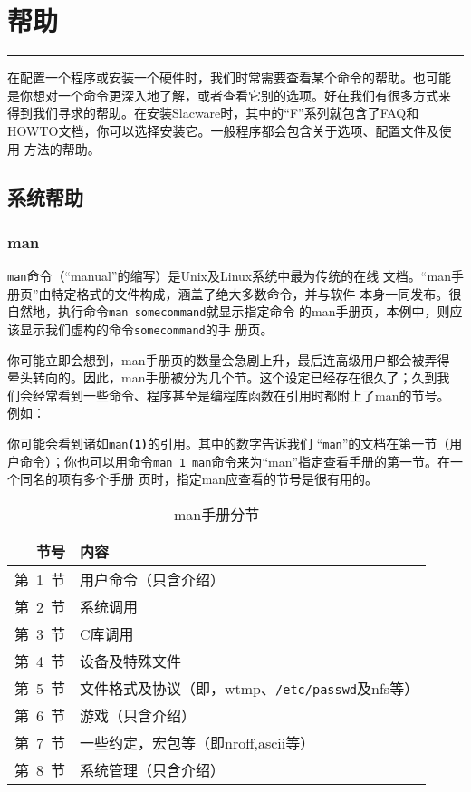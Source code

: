 
\chapter{帮助}
\label{chap:help}

\rule[0mm]{\textwidth}{.1pt}

在配置一个程序或安装一个硬件时，我们时常需要查看某个命令的帮助。也可能
是你想对一个命令更深入地了解，或者查看它别的选项。好在我们有很多方式来
得到我们寻求的帮助。在安装Slacware时，其中的``F''系列就包含了FAQ和
HOWTO文档，你可以选择安装它。一般程序都会包含关于选项、配置文件及使用
方法的帮助。

\section{系统帮助}
\label{sec:help:systemHelp}

\subsection{man}
\label{sec:help:systemHelp:man}

\texttt{man}命令（``manual''的缩写）是Unix及Linux系统中最为传统的在线
文档。``man手册页''由特定格式的文件构成，涵盖了绝大多数命令，并与软件
本身一同发布。很自然地，执行命令\texttt{man somecommand}就显示指定命令
的man手册页，本例中，则应该显示我们虚构的命令\texttt{somecommand}的手
册页。

你可能立即会想到，man手册页的数量会急剧上升，最后连高级用户都会被弄得
晕头转向的。因此，man手册被分为几个节。这个设定已经存在很久了；久到我
们会经常看到一些命令、程序甚至是编程库函数在引用时都附上了man的节号。
例如：

你可能会看到诸如\texttt{man\textbf{(1)}}的引用。其中的数字告诉我们
``\texttt{man}''的文档在第一节（用户命令）；你也可以用命令\texttt{man
  1 man}命令来为``man''指定查看手册的第一节。在一个同名的项有多个手册
页时，指定man应查看的节号是很有用的。

\begin{table}[hpbf]
  \centering
  \begin{tabular}{rl}
    \hline \hline 
    \textbf{节号} & \textbf{内容} \\ \hline 
    第~1~节 & 用户命令（只含介绍） \\
    第~2~节 & 系统调用 \\
    第~3~节 & C库调用 \\
    第~4~节 & 设备及特殊文件 \\
    第~5~节 & 文件格式及协议（即，wtmp、\texttt{/etc/passwd}及nfs等）
    \\
    第~6~节 & 游戏（只含介绍） \\
    第~7~节 & 一些约定，宏包等（即nroff,ascii等） \\
    第~8~节 & 系统管理（只含介绍） \\
    \hline \hline
    
  \end{tabular}
  \caption{man手册分节}
  \label{tab:manPageSections}
\end{table}

